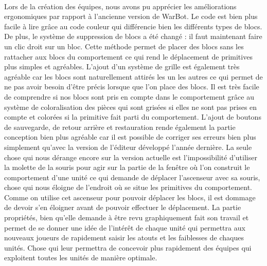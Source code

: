 \documentclass{report}
\begin{document}
\paragraph{}
  Lors de la création des équipes, nous avons pu apprécier les améliorations ergonomiques par rapport à l’ancienne version de WarBot. Le code est bien plus facile à lire grâce au code couleur qui différencie bien les différents types de blocs. De plus, le système de suppression de blocs a été changé : il faut maintenant faire un clic droit sur un bloc. Cette méthode permet de placer des blocs sans les rattacher aux blocs du comportement ce qui rend le déplacement de primitives plus simples et agréables. \newline
L’ajout d’un système de grille est également très agréable car les blocs sont naturellement attirés les un les autres ce qui permet de ne pas avoir besoin d’être précis lorsque que l’on place des blocs. \newline
Il est très facile de comprendre si nos blocs sont pris en compte dans le comportement grâce au système de coloralisation des pièces qui sont grisées si elles ne sont pas prises en compte et colorées si la primitive fait parti du comportement. \newline  
L’ajout de boutons de sauvegarde, de retour arrière et restauration rende également la partie conception bien plus agréable car il est possible de corriger ses erreurs bien plus simplement qu’avec la version de l’éditeur développé l’année dernière.\newline
La seule chose qui nous dérange encore sur la version actuelle est l’impossibilité d’utiliser la molette de la souris pour agir sur la partie de la fenêtre où l’on construit le comportement d’une unité ce qui demande de déplacer l’ascenseur avec sa souris, chose qui nous éloigne de l’endroit où se situe les primitives du comportement. Comme on utilise cet ascenseur pour pouvoir déplacer les blocs, il est dommage de devoir s’en éloigner avant de pouvoir effectuer le déplacement.\newline
La partie propriétés, bien qu’elle demande à être revu graphiquement fait son travail et permet de se donner une idée de l’intérêt de chaque unité qui permettra aux nouveaux joueurs de rapidement saisir les atouts et les faiblesses de chaques unités. Chose qui leur permettra de concevoir plus rapidement des équipes qui exploitent toutes les unités de manière optimale.
\end{document}
